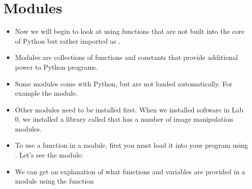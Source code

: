 \documentclass[letterpaper,10pt,english]{sphinxmanual}
\begin{document}
\section{Modules}
\label{\detokenize{lecture_notes/lec04_modules_functions1:modules}}\begin{itemize}
\item {} 
Now we will begin to look at using functions that are not built
into the core of Python but rather imported as .

\item {} 
Modules are collections of functions and constants that
provide additional power to Python programs.

\item {} 
Some modules come with Python, but are not loaded automatically. For
example the  module.

\item {} 
Other modules need to be installed first. When we installed software
in Lab 0, we installed a library called  that has a
number of image manipulation modules.

\item {} 
To use a function in a module, first you must load it into your
program using . Let’s see the  module:

%
\begin{sphinxVerbatim}[commandchars=\\\{\}]
 
\end{sphinxVerbatim}

\item {} 
We can get an explanation of what functions and variables are
provided in a module using the  function

%
\begin{sphinxVerbatim}[commandchars=\\\{\}]
 
\end{sphinxVerbatim}

\end{itemize}
\end{document}
